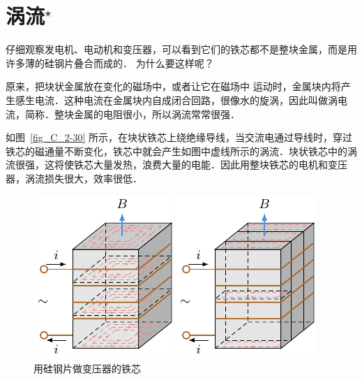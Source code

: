 \section{涡流$^\star$}

仔细观察发电机、电动机和变压器，可以看到它们的铁芯都不是整块金属，而是用许多薄的硅钢片叠合而成的．
为什么要这样呢？

原来，把块状金属放在变化的磁场中，或者让它在磁场中
运动时，金属块内将产生感生电流．这种电流在金属块内自成闭合回路，很像水的旋涡，因此叫做涡电流，简称．整块金属的电阻很小，所以涡流常常很强．

如图~\ref{fig_C_2-30} 所示，在块状铁芯上绕绝缘导线，当交流电通过导线时，穿过铁芯的磁通量不断变化，铁芯中就会产生如图中虚线所示的涡流．块状铁芯中的涡流很强，这将使铁芯大量发热，浪费大量的电能．因此用整块铁芯的电机和变压器，涡流损失很大，效率很低．

\begin{figure}[htbp]
    \centering
    \begin{minipage}[t]{0.4\textwidth}
        \centering
        \includegraphics{fig/C/2-30.pdf}
        \caption{}\label{fig_C_2-30}
    \end{minipage}
    \begin{minipage}[t]{0.5\textwidth}
        \centering
        \includegraphics{fig/C/2-31.pdf}
        \caption{用硅钢片做变压器的铁芯}\label{fig_C_2-31}
    \end{minipage}
\end{figure}



